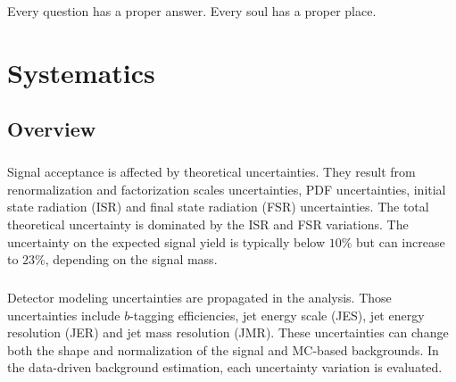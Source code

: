 \begin{savequote}[75mm]
Every question has a proper answer. Every soul has a proper place.
\end{savequote}

\chapter{Systematics}
\label{sec:systematics}


\section{Overview}
\label{sec:systematics-overview}
\paragraph{}
Signal acceptance is affected by theoretical uncertainties.
They result from renormalization and factorization scales uncertainties, PDF uncertainties, initial state radiation (ISR) and final state radiation (FSR) uncertainties.
The total theoretical uncertainty is dominated by the ISR and FSR variations.
The uncertainty on the expected signal yield is typically below $10\%$ but can increase to $23\%$, depending on the signal mass.

\paragraph{}
Detector modeling uncertainties are propagated in the analysis.
Those uncertainties include $b$-tagging efficiencies, jet energy scale (JES), jet energy resolution (JER) and jet mass resolution (JMR). 
These uncertainties can change both the shape and normalization of the signal and MC-based backgrounds. 
In the data-driven background estimation, each uncertainty variation is evaluated.

